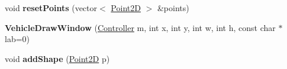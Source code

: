 \begin{DoxyCompactItemize}
\item 
\hypertarget{class_vehicle_draw_window_ab62153c6478650e51dcbe8b28370af67}{
void {\bfseries resetPoints} (vector$<$ \hyperlink{class_point2_d}{Point2D} $>$ \&points)}
\label{class_vehicle_draw_window_ab62153c6478650e51dcbe8b28370af67}

\item 
\hypertarget{class_vehicle_draw_window_abcb51594f66cbc571caa4749e309aec0}{
{\bfseries VehicleDrawWindow} (\hyperlink{class_controller}{Controller} m, int x, int y, int w, int h, const char $\ast$lab=0)}
\label{class_vehicle_draw_window_abcb51594f66cbc571caa4749e309aec0}

\item 
\hypertarget{class_vehicle_draw_window_ac334e1b40e59aea35538368db64f08ef}{
void {\bfseries addShape} (\hyperlink{class_point2_d}{Point2D} p)}
\label{class_vehicle_draw_window_ac334e1b40e59aea35538368db64f08ef}

\end{DoxyCompactItemize}
